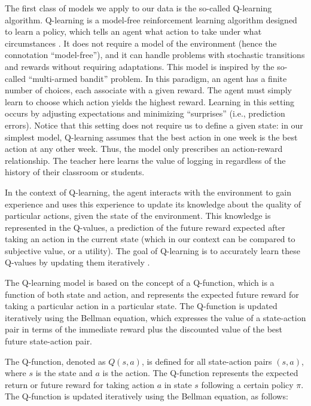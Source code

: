 \documentclass[
  number,
  preprint,
  3p,
  onecolumn]{elsarticle}
\begin{document}
The first class of models we apply to our data is the so-called
Q-learning algorithm. Q-learning is a model-free reinforcement learning
algorithm designed to learn a policy, which tells an agent what action
to take under what circumstances \citep{watkins1992}. It does not
require a model of the environment (hence the connotation
``model-free''), and it can handle problems with stochastic transitions
and rewards without requiring adaptations. This model is inspired by the
so-called ``multi-armed bandit'' problem. In this paradigm, an agent has
a finite number of choices, each associate with a given reward. The
agent must simply learn to choose which action yields the highest
reward. Learning in this setting occurs by adjusting expectations and
minimizing ``surprises'' (i.e., prediction errors). Notice that this
setting does not require us to define a given state: in our simplest
model, Q-learning assumes that the best action in one week is the best
action at any other week. Thus, the model only prescribes an
action-reward relationship. The teacher here learns the value of logging
in regardless of the history of their classroom or students.

In the context of Q-learning, the agent interacts with the environment
to gain experience and uses this experience to update its knowledge
about the quality of particular actions, given the state of the
environment. This knowledge is represented in the Q-values, a prediction
of the future reward expected after taking an action in the current
state (which in our context can be compared to subjective value, or a
utility). The goal of Q-learning is to accurately learn these Q-values
by updating them iteratively \citep{rummery}.

The Q-learning model is based on the concept of a Q-function, which is a
function of both state and action, and represents the expected future
reward for taking a particular action in a particular state. The
Q-function is updated iteratively using the Bellman equation, which
expresses the value of a state-action pair in terms of the immediate
reward plus the discounted value of the best future state-action pair.

The Q-function, denoted as \(Q(s, a)\), is defined for all state-action
pairs \((s, a)\), where \(s\) is the state and \(a\) is the action. The
Q-function represents the expected return or future reward for taking
action \(a\) in state \(s\) following a certain policy \(\pi\). The
Q-function is updated iteratively using the Bellman equation, as
follows:
\end{document}
